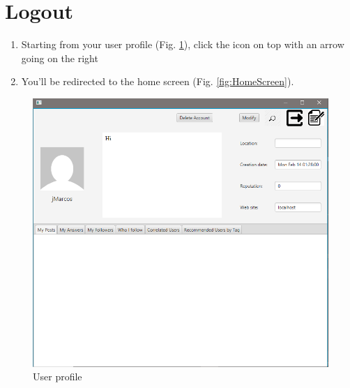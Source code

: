 \documentclass[11pt]{report}
\begin{document}
\section{Logout}
\begin{enumerate}
    \item Starting from your user profile (Fig. \ref{fig:ProfiloUtenteForLogout}), click the icon on top with an arrow going on the right
    \item You'll be redirected to the home screen (Fig. \ref{fig:HomeScreen}).
\end{enumerate}
\begin{figure}[H]
  \centering
  \includegraphics[width=\textwidth,keepaspectratio=true]{img/user_manual/ProfiloUtente.png}
  \caption{User profile}
  \label{fig:ProfiloUtenteForLogout}
\end{figure}
\end{document}
